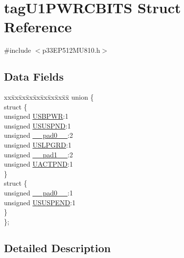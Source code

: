 \hypertarget{structtag_u1_p_w_r_c_b_i_t_s}{}\section{tag\+U1\+P\+W\+R\+C\+B\+I\+TS Struct Reference}
\label{structtag_u1_p_w_r_c_b_i_t_s}


{\ttfamily \#include $<$p33\+E\+P512\+M\+U810.\+h$>$}

\subsection*{Data Fields}
\begin{DoxyCompactItemize}
\item 
\begin{tabbing}
xx\=xx\=xx\=xx\=xx\=xx\=xx\=xx\=xx\=\kill
union \{\\
\>struct \{\\
\>\>unsigned \hyperlink{structtag_u1_p_w_r_c_b_i_t_s_a188cc9f6cdb254b06a3ef94569527475}{USBPWR}:1\\
\>\>unsigned \hyperlink{structtag_u1_p_w_r_c_b_i_t_s_a9168ae95bb66f02230189d986bc41779}{USUSPND}:1\\
\>\>unsigned \hyperlink{structtag_u1_p_w_r_c_b_i_t_s_adf71f3d8410c1f1dbbc96680a92c49af}{\_\_pad0\_\_}:2\\
\>\>unsigned \hyperlink{structtag_u1_p_w_r_c_b_i_t_s_a816fb05c2a70525c3700832bd0ef17e4}{USLPGRD}:1\\
\>\>unsigned \hyperlink{structtag_u1_p_w_r_c_b_i_t_s_acaf2d0924a107ec6e8d2e31febaf66f9}{\_\_pad1\_\_}:2\\
\>\>unsigned \hyperlink{structtag_u1_p_w_r_c_b_i_t_s_a4bc3edc55f9d2da7994c0bdda1090922}{UACTPND}:1\\
\>\} \\
\>struct \{\\
\>\>unsigned \hyperlink{structtag_u1_p_w_r_c_b_i_t_s_adf71f3d8410c1f1dbbc96680a92c49af}{\_\_pad0\_\_}:1\\
\>\>unsigned \hyperlink{structtag_u1_p_w_r_c_b_i_t_s_abb1b1eb9c6839dd338d49fe7c6026016}{USUSPEND}:1\\
\>\} \\
\}; \\

\end{tabbing}\end{DoxyCompactItemize}


\subsection{Detailed Description}


